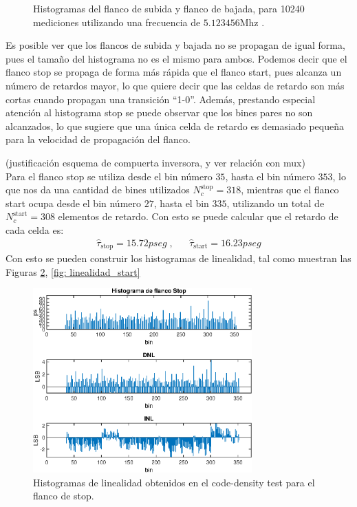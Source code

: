 \begin{figure}[H]
\begin{subfigure}{0.45\textwidth}
{           }
     \end{subfigure}
     \caption{Histogramas del flanco de subida y flanco de bajada, para 10240 mediciones
     utilizando una frecuencia de $5.123456$Mhz .}
     \label{fig: histogramas_magic}
\end{figure}%

Es posible ver que los flancos de subida y bajada no se propagan de igual forma, pues el tamaño
del histograma no es el mismo para ambos. Podemos decir que el flanco stop se propaga de forma más
rápida que el flanco start, pues alcanza un número de retardos mayor, 
lo que quiere decir que las celdas de retardo son más cortas cuando propagan una transición ``1-0''.
Además, prestando especial atención al histograma stop se puede observar que los bines pares no son alcanzados,
lo que sugiere que una única celda de retardo es demasiado pequeña para la velocidad de propagación del flanco.

(justificación esquema de compuerta inversora, y ver relación con mux)\\

Para el flanco stop se utiliza desde el bin número $35$, hasta el bin número $353$, lo que nos
da una cantidad de bines utilizados $N_c^{\text{stop}} = 318$, mientras que el flanco start
ocupa desde el bin número $27$, hasta el bin $335$, utilizando un total de $N_c^{\text{start}} = 308$
elementos de retardo. Con esto se puede calcular que el retardo de cada celda es:
\begin{align}
     \hat{\tau}_{\text{stop}} = 15.72pseg \; , && \hat{\tau}_{\text{start}} = 16.23pseg
\end{align}
Con esto se pueden construir los histogramas de linealidad, tal como muestran las Figuras \ref{fig: linealidad_stop}, \ref{fig: linealidad_start}

\begin{figure}[H]
      \centering
      \includegraphics[width=0.75\textwidth]{imagenes/linealidad_stop.eps}
      \caption{Histogramas de linealidad obtenidos en el code-density test para el flanco de stop.}
      \label{fig: linealidad_stop}
\end{figure}

